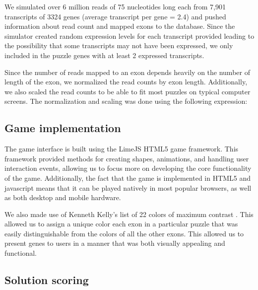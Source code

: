 \documentclass[12pt]{article}
\begin{document}
We simulated over 6 million reads of 75 nucleotides long each from 7,901 transcripts of 3324 genes (average transcript per gene = 2.4) and pushed information about read count and mapped exons to the database. Since the simulator created random expression levels for each transcript provided leading to the possibility that some transcripts may not have been expressed, we only included in the puzzle genes with at least 2 expressed transcripts.

Since the number of reads mapped to an exon depends heavily on the number of length of the exon, we normalized the read counts by exon length. Additionally, we also scaled the read counts to be able to fit most puzzles on typical computer screens. The normalization and scaling was done using the following expression:

\subsection*{Game implementation}
The game interface is built using the LimeJS HTML5 game framework. This framework provided methods for creating shapes,
animations, and handling user interaction events, allowing us to focus more on developing the core functionality of the game.
Additionally, the fact that the game is implemented in HTML5 and javascript means that it can be played natively in most 
popular browsers, as well as both desktop and mobile hardware.

We also made use of Kenneth Kelly's list of 22 colors of maximum contrast \citep{green2010colour}. This allowed us to assign a unique color each exon
in a particular puzzle that was easily distinguishable from the colors of all the other exons. This allowed us to present genes to 
users in a manner that was both visually appealing and functional.

\subsection*{Solution scoring}
\label{sec:scoring}
\end{document}
